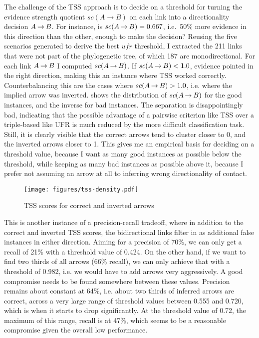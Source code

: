 The challenge of the TSS approach is to decide on a threshold for turning the evidence strength quotient $sc(A \rightarrow B)$ on each link into a directionality decision $A \kern 2pt\hbox{$\rightarrow$}\kern 2pt B$. For instance, is $sc(A \kern 2pt\hbox{$\rightarrow$}\kern 2pt B) = 0.667$, i.e.\ 50\% more evidence in this direction than the other, enough to make the decision? Reusing the five scenarios generated to derive the best $ufr$ threshold, I extracted the 211 links that were not part of the phylogenetic tree, of which 187 are monodirectional. For each link $A \kern 2pt\hbox{$\rightarrow$}\kern 2pt B$ I computed $sc(A \kern 2pt\hbox{$\rightarrow$}\kern 2pt B)$. If $sc(A \kern 2pt\hbox{$\rightarrow$}\kern 2pt B) < 1.0$, evidence pointed in the right direction, making this an instance where TSS worked correctly. Counterbalancing this are the cases where $sc(A \kern 2pt\hbox{$\rightarrow$}\kern 2pt B) > 1.0$, i.e. where the implied arrow was inverted.  shows the distribution of $sc(A \kern 2pt\hbox{$\rightarrow$}\kern 2pt B)$ for the good instances, and the inverse for bad instances. The separation is disappointingly bad, indicating that the possible advantage of a pairwise criterion like TSS over a triple-based like UFR is much reduced by the more difficult classification task. Still, it is clearly visible that the correct arrows tend to cluster closer to 0, and the inverted arrows closer to 1. This gives me an empirical basis for deciding on a threshold value, because I want as many good instances as possible below the threshold, while keeping as many bad instances as possible above it, because I prefer not assuming an arrow at all to inferring wrong directionality of contact.

\begin{figure}
 \texttt{[image: figures/tss-density.pdf]}
 \caption{TSS scores for correct and inverted arrows}
 \label{tss-scores}
\end{figure}

This is another instance of a precision-recall tradeoff, where in addition to the correct and inverted TSS scores, the bidirectional links filter in as additional false instances in either direction. Aiming for a precision of 70\%, we can only get a recall of 21\% with a threshold value of 0.424. On the other hand, if we want to find two thirds of all arrows (66\% recall), we can only achieve that with a threshold of 0.982, i.e. we would have to add arrows very aggressively. A good compromise needs to be found somewhere between these values. Precision remains about constant at 64\%, i.e. about two thirds of inferred arrows are correct, across a very large range of threshold values between 0.555 and 0.720, which is when it starts to drop significantly. At the threshold value of 0.72, the maximum of this range, recall is at 47\%, which seems to be a reasonable compromise given the overall low performance.

